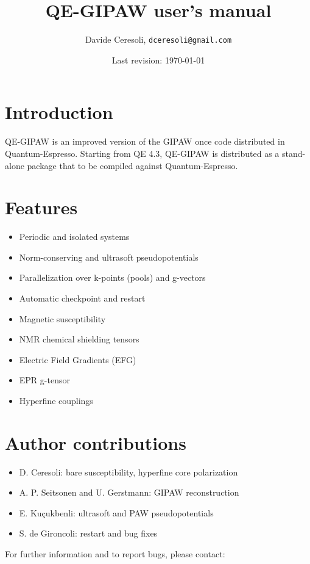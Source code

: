 \documentclass[a4paper,11pt,twoside]{article}
\title{QE-GIPAW user's manual}
\author{Davide Ceresoli, \texttt{dceresoli@gmail.com}}
\date{Last revision: \today}
\begin{document}
\maketitle
\thispagestyle{empty}

\section{Introduction}
QE-GIPAW is an improved version of the GIPAW once code distributed in
Quantum-Espresso. Starting from QE 4.3, QE-GIPAW is distributed as a
stand-alone package that to be compiled against Quantum-Espresso.

\section{Features}
\begin{itemize}
  \item Periodic and isolated systems
  \item Norm-conserving and ultrasoft pseudopotentials
  \item Parallelization over k-points (pools) and g-vectors
  \item Automatic checkpoint and restart
  \item Magnetic susceptibility
  \item NMR chemical shielding tensors
  \item Electric Field Gradients (EFG)
  \item EPR g-tensor
  \item Hyperfine couplings
\end{itemize}

\section{Author contributions}
\begin{itemize}
  \item D. Ceresoli: bare susceptibility, hyperfine core polarization
  \item A. P. Seitsonen and U. Gerstmann: GIPAW reconstruction 
  \item E. Kuçukbenli: ultrasoft and PAW pseudopotentials 
  \item S. de Gironcoli: restart and bug fixes 
\end{itemize}
For further information and to report bugs, please contact:
\end{document}
